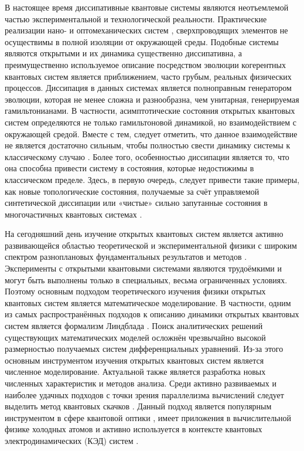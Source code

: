 
{\actuality} 
В настоящее время диссипативные квантовые системы являются неотъемлемой частью экспериментальной и технологической реальности.
Практические реализации нано- \autocite{Poot2012} и оптомеханических систем \autocite{Aspelmeyer2014}, сверхпроводящих элементов \autocite{Clarke2008} не осуществимы в полной изоляции от окружающей среды.
Подобные системы являются открытыми и их динамика существенно диссипативна, а преимущественно используемое описание посредством эволюции когерентных квантовых систем является приближением, часто грубым, реальных физических процессов.
Диссипация в данных системах является полноправным генератором эволюции, которая не менее сложна и разнообразна, чем унитарная, генерируемая гамильтонианами.
В частности, асимптотические состояния открытых квантовых систем определяются не только гамильтоновой динамикой, но взаимодействием с окружающей средой.
Вместе с тем, следует отметить, что данное взаимодействие не является достаточно сильным, чтобы полностью свести динамику системы к классическому случаю \autocite{Breuer2007}.
Более того, особенностью диссипации является то, что она способна привести систему в состояния, которые недостижимы в классическом пределе.
Здесь, в первую очередь, следует привести такие примеры, как новые топологические состояния, получаемые за счёт управляемой синтетической диссипации \autocite{Diehl2011} или «чистые» сильно запутанные состояния в многочастичных квантовых системах \autocite{Kraus2008}.

На сегодняшний день изучение открытых квантовых систем является активно развивающейся областью теоретической и экспериментальной физики с широким спектром разноплановых фундаментальных результатов и методов \autocite{Breuer2007}.
Эксперименты с открытыми квантовыми системами являются трудоёмкими и могут быть выполнены только в специальных, весьма ограниченных условиях.
Поэтому основным подходом теоретического изучения физики открытых квантовых систем является математическое моделирование.
В частности, одним из самых распространённых подходов к описанию динамики открытых квантовых систем является формализм Линдблада \autocite{Lindblad1976, Gorini1976}.
Поиск аналитических решений существующих математических моделей осложнён чрезвычайно высокой размерностью получаемых систем дифференциальных уравнений.
Из-за этого основным инструментом изучения открытых квантовых систем является численное моделирование.
Актуальной также является разработка новых численных характеристик и методов анализа.
Среди активно развиваемых и наиболее удачных подходов с точки зрения параллелизма вычислений следует выделить метод квантовых скачков \autocite{Dalibard1992, Dum1992, Plenio1998}.
Данный подход является популярным инструментом в сфере квантовой оптики \autocite{Carmichael1993}, имеет приложения в вычислительной физике холодных атомов \autocite{Diehl2011, Diehl2008, Marcuzzi2014} и активно используется в контексте квантовых электродинамических (КЭД) систем \autocite{Imamoglu1999, Walther2006, Arakawa2015}.

